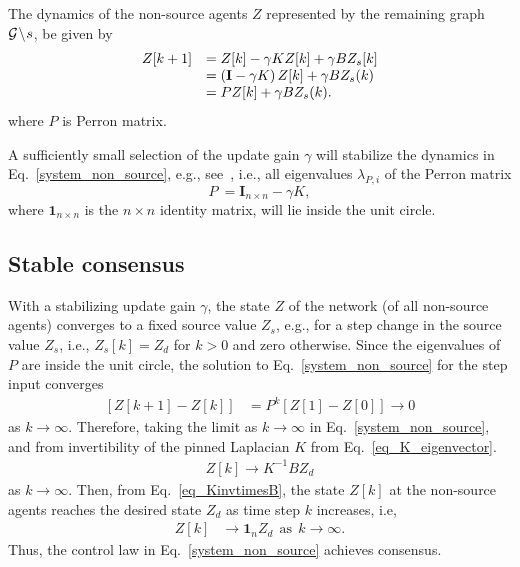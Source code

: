 \documentclass[conference]{IEEEtran}
\begin{document}
\vspace{0.1in}
The dynamics of the non-source agents 
$Z$ represented by the remaining graph ${\cal{G}}\!\setminus\!s$,  be  given by 
\begin{equation}
\begin{array}{rl}
Z[k+1] &  = Z[k]  -\gamma  K Z[k] + \gamma   B  Z_s[k]
 \\
&  = \left(   {\bf{I}} - \gamma  K     \right) Z[k]   + \gamma   B  Z_s (k) \\
& = P  Z[k] + \gamma   B  Z_s (k) .
\label{system_non_source}
\end{array}
\end{equation}
where $P$ is Perron matrix. 


\vspace{0.1in}
A sufficiently small selection of the update gain $\gamma $ will stabilize the dynamics in Eq.~\eqref{system_non_source}, e.g., see~\cite{Olfati_Murray_07}, i.e., 
all eigenvalues $\lambda_{P,i}$ of the Perron matrix 
$$P   ~ =  {\textbf{I}}_{n\times n}-\gamma  K,$$
where $ {\textbf{1}}_{n\times n}$ is the $n\times n$ identity matrix, 
will lie inside the unit circle. 

\subsection{Stable consensus}
With a stabilizing  update gain $\gamma$, the state $Z$ of the network (of all non-source agents)  converges to a fixed source value $Z_s$, e.g., 
for a step change in the source value $Z_s$,  i.e., $Z_s[k] = Z_d$ for $k > 0$ and zero otherwise. 
Since the eigenvalues of $P$ are inside the unit circle, the solution to Eq.~\eqref{system_non_source} for the step input 
converges 
\begin{eqnarray}
\left[ Z[k+1] - Z[k] \right] &  = P^{k}  \left[ Z[1] -  Z[0] \right]  \rightarrow 0 
\label{Eq_controlled_gen_soln}
\end{eqnarray}
as $ k \rightarrow \infty$.
Therefore, taking the limit as $k \rightarrow \infty$  in Eq.~\eqref{system_non_source}, and from invertibility of the pinned Laplacian $K $ from 
Eq.~\eqref{eq_K_eigenvector}. 
\begin{eqnarray}
Z[k]  \rightarrow K^{-1} B  Z_d
\label{Eq_controlled_gen_soln_2}
\end{eqnarray}
 as $ k \rightarrow \infty$.  
Then, from Eq.~\eqref{eq_KinvtimesB}, 
the state $Z[k]$  at the non-source agents reaches 
the desired state $Z_d$ as time step $k$ increases, i.e, 
\begin{eqnarray}
Z[k]  &    \rightarrow {\textbf{1}}_n Z_d ~~{\mbox{as}}~~  k \rightarrow \infty.
\label{system_non_source_stability}
\end{eqnarray}
Thus, the control law in Eq.~\eqref{system_non_source} achieves consensus. 
\end{document}
